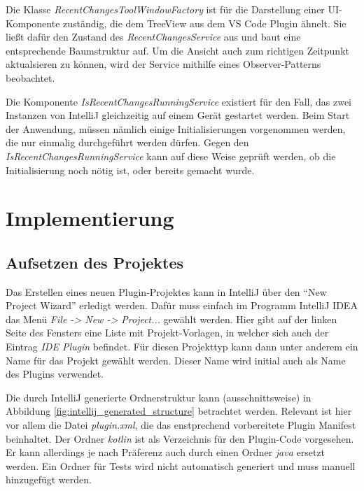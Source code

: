 Die Klasse \emph{RecentChangesToolWindowFactory} ist für die Darstellung
einer UI-Komponente zuständig, die dem TreeView aus dem VS Code Plugin
ähnelt. Sie ließt dafür den Zustand des \emph{RecentChangesService} aus
und baut eine entsprechende Baumstruktur auf. Um die Ansicht auch zum richtigen
Zeitpunkt aktualsieren zu können, wird der Service mithilfe eines
Observer-Patterns \cite{2005Dp:e} beobachtet.

Die Komponente \emph{IsRecentChangesRunningService} existiert für den Fall,
das zwei Instanzen von IntelliJ gleichzeitig auf einem Gerät gestartet werden.
Beim Start der Anwendung, müssen nämlich einige Initialisierungen vorgenommen
werden, die nur einmalig durchgeführt werden dürfen. Gegen den
\emph{IsRecentChangesRunningService} kann auf diese Weise geprüft werden, ob
die Initialisierung noch nötig ist, oder bereits gemacht wurde.


\section{Implementierung}
\label{sec:EntwicklungIntelliJ_Implementierung}

\subsection{Aufsetzen des Projektes}


Das Erstellen eines neuen Plugin-Projektes kann in IntelliJ über den 
\enquote{New Project Wizard} erledigt werden. Dafür muss einfach
im Programm IntelliJ IDEA das Menü \emph{File -> New -> Project...}
gewählt werden. Hier gibt auf der linken Seite des Fensters eine 
Liste mit Projekt-Vorlagen, in welcher sich auch der Eintrag 
\emph{IDE Plugin} befindet. Für diesen Projekttyp kann dann unter anderem
ein Name für das Projekt gewählt werden. Dieser Name wird initial auch als
Name des Plugins verwendet.

Die durch IntelliJ generierte Ordnerstruktur kann (ausschnittsweise) in 
Abbildung \ref{fig:intellij_generated_structure} betrachtet werden.
Relevant ist hier vor allem die Datei \emph{plugin.xml}, die das 
enstprechend vorbereitete Plugin Manifest beinhaltet. Der Ordner
\emph{kotlin} ist als Verzeichnis für den Plugin-Code vorgesehen.
Er kann allerdings je nach Präferenz auch durch einen Ordner \emph{java}
ersetzt werden. Ein Ordner für Tests wird nicht automatisch generiert
und muss manuell hinzugefügt werden.

